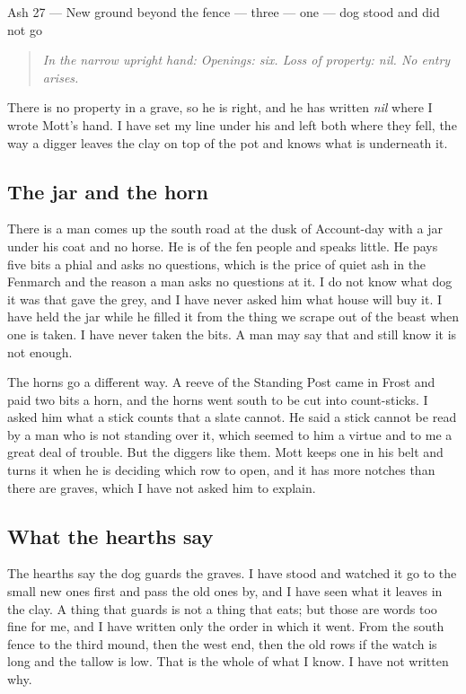 \documentclass{design/chronicle}
\begin{document}
Ash 27 — New ground beyond the fence — three — one — dog stood and did not go\par

\begin{quote}\itshape \emph{In the narrow upright hand:} Openings: six. Loss of property: nil. No entry arises.\end{quote}

There is no property in a grave, so he is right, and he has written \emph{nil} where I wrote Mott’s hand. I have set my line under his and left both where they fell, the way a digger leaves the clay on top of the pot and knows what is underneath it.

\subsection*{The jar and the horn}

There is a man comes up the south road at the dusk of Account-day with a jar under his coat and no horse. He is of the fen people and speaks little. He pays five bits a phial and asks no questions, which is the price of quiet ash in the Fenmarch and the reason a man asks no questions at it. I do not know what dog it was that gave the grey, and I have never asked him what house will buy it. I have held the jar while he filled it from the thing we scrape out of the beast when one is taken. I have never taken the bits. A man may say that and still know it is not enough.

The horns go a different way. A reeve of the Standing Post came in Frost and paid two bits a horn, and the horns went south to be cut into count-sticks. I asked him what a stick counts that a slate cannot. He said a stick cannot be read by a man who is not standing over it, which seemed to him a virtue and to me a great deal of trouble. But the diggers like them. Mott keeps one in his belt and turns it when he is deciding which row to open, and it has more notches than there are graves, which I have not asked him to explain.

\subsection*{What the hearths say}

The hearths say the dog guards the graves. I have stood and watched it go to the small new ones first and pass the old ones by, and I have seen what it leaves in the clay. A thing that guards is not a thing that eats; but those are words too fine for me, and I have written only the order in which it went. From the south fence to the third mound, then the west end, then the old rows if the watch is long and the tallow is low. That is the whole of what I know. I have not written why.
\end{document}
